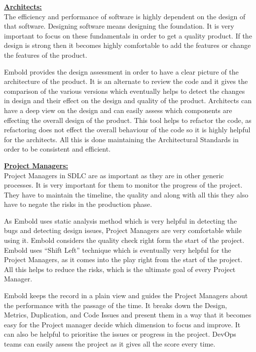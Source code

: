 \textbf{\underline{Architects:}} \vspace{2mm}\\
\indent The efficiency and performance of software is highly dependent on the design of that software. Designing software means designing the foundation. It is very important to focus on these fundamentals in order to get a quality product. If the design is strong then it becomes highly comfortable to add the features or change the features of the product. \par \vspace{1mm}
Embold provides the design assessment in order to have a clear picture of the architecture of the product. It is an alternate to review the code and it gives the comparison of the various versions which eventually helps to detect the changes in design and their effect on the design and quality of the product. Architects can have a deep view on the design and can easily assess which components are effecting the overall design of the product. This tool helps to refactor the code, as refactoring does not effect the overall behaviour of the code so it is highly helpful for the architects. All this is done maintaining the Architectural Standards in order to be consistent and efficient.

\textbf{\underline{Project Managers:}} \vspace{1mm}\\
\indent Project Managers in SDLC are as important as they are in other generic processes. It is very important for them to monitor the progress of the project. They have to maintain the timeline, the quality and along with all this they also have to negate the risks in the production phase. \par
 As Embold uses static analysis method which is very helpful in detecting the bugs and detecting design issues, Project Managers are very comfortable while using it. Embold considers the quality check right form the start of the project. Embold uses ``Shift Left'' technique which is eventually very helpful for the Project Managers, as it comes into the play right from the start of the project. All this helps to reduce the risks, which is the ultimate goal of every Project Manager.\par
Embold keeps the record in a plain view and guides the Project Managers about the performance with the passage of the time. It  breaks down the Design, Metrics, Duplication, and Code Issues and present them in a way that it becomes easy for the Project manager  decide which dimension to focus and improve. It can also be helpful to prioritise the issues or progress in the project. DevOps teams can easily assess the project as it gives all the score every time.  
